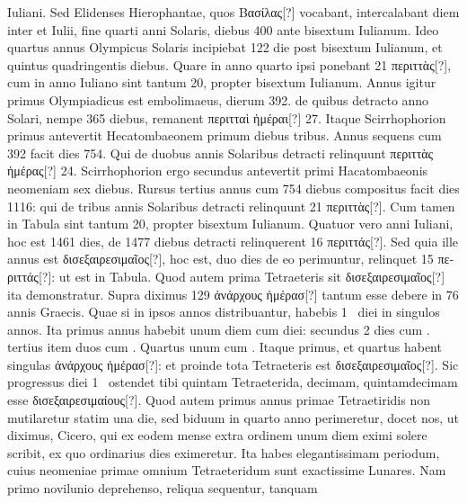 Iuliani.
Sed Elidenses Hierophantae, quos \textgreek{Βασίλας[?]} vocabant,
intercalabant
diem inter  et  Iulii, fine quarti anni Solaris, diebus
400 ante bisextum Iulianum.
Ideo quartus annus Olympicus Solaris
incipiebat 122 die post bisextum Iulianum, et quintus quadringentis
diebus.
Quare in anno quarto ipsi ponebant 21 \textgreek{περιττὰς[?]}, cum in
anno Iuliano sint tantum 20, propter bisextum Iulianum.
Annus igitur
primus Olympiadicus est embolimaeus, dierum 392. de quibus
detracto anno Solari, nempe 365 diebus, remanent
 \textgreek{περιτταὶ ἡμέραι[?]} 27.
Itaque Scirrhophorion primus antevertit Hecatombaeonem primum
diebus tribus.
Annus sequens cum 392 facit dies 754.
Qui de duobus
annis Solaribus detracti relinquunt \textgreek{περιττὰς ἡμέρας[?]} 24.
Scirrhophorion
ergo secundus antevertit primi Hacatombaeonis neomeniam sex diebus.
Rursus tertius annus cum 754 diebus compositus facit dies 1116: qui
de tribus annis Solaribus detracti relinquunt 21 \textgreek{περιττὰς[?]}.
Cum tamen in
Tabula sint tantum 20, propter bisextum Iulianum.
Quatuor vero anni
Iuliani, hoc est 1461 dies, de 1477 diebus detracti relinquerent 16
\textgreek{περιττάς[?]}.
Sed quia ille annus est \textgreek{δισεξαιρεσιμαῖος[?]}, hoc est,
 duo dies de eo
perimuntur, relinquet 15 \textgreek{περιττάς[?]}: ut est in Tabula.
Quod autem prima
Tetraeteris sit \textgreek{δισεξαιρεσιμαῖος[?]} ita demonstratur.
Supra diximus 129
\textgreek{ἀνάρχους ἡμέρασ[?]} tantum esse debere in 76 annis Graecis.
Quae si in ipsos
annos distribuantur, habebis 1~ diei in singulos annos.
Ita primus annus
habebit unum diem cum  diei:
 secundus 2 dies cum . tertius item
duos cum .
Quartus unum cum .
Itaque primus, et quartus
habent singulas \textgreek{ἀνάρχους ἡμέρασ[?]}:
 et proinde tota Tetraeteris est \textgreek{δισεξαιρεσιμαῖος[?]}.
Sic progressus diei 1~
 ostendet tibi quintam Tetraeterida,
decimam, quintamdecimam esse \textgreek{δισεξαιρεσιμαίους[?]}.
Quod autem
primus annus primae Tetraetiridis non mutilaretur statim una die, sed
biduum in quarto anno perimeretur, docet nos, ut diximus, Cicero,
qui ex eodem mense extra ordinem unum diem eximi solere scribit, ex
quo ordinarius dies eximeretur.
Ita habes elegantissimam periodum,
cuius neomeniae primae omnium Tetraeteridum sunt exactissime Lunares.
Nam primo novilunio deprehenso, reliqua sequentur, tanquam
